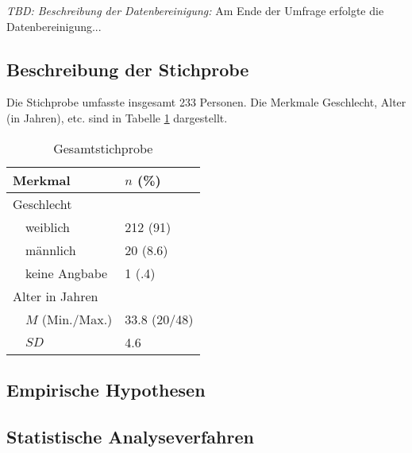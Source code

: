 \textit{TBD: Beschreibung der Datenbereinigung:} Am Ende der Umfrage erfolgte die Datenbereinigung...


\subsection{Beschreibung der Stichprobe}
Die Stichprobe umfasste insgesamt 233 Personen. Die Merkmale Geschlecht, Alter (in Jahren), etc. sind in Tabelle \ref{table:Stichprobe} dargestellt.

\begin{table}[htbp]

\begin{tabular}{m{0.5em}  m{10em}  m{5em}} 
  \hline
  \multicolumn{2}{l}{\textbf{Merkmal}} & \textbf{$n$ (\%)} \\
  \hline
  \multicolumn{2}{l}{Geschlecht} \\ 
   & weiblich & 212 (91)\\ 
   & männlich & 20 (8.6)\\ 
   & keine Angbabe & 1 (.4)\\ 
   
  \multicolumn{2}{l}{Alter in Jahren} \\
  & $M$ (Min./Max.) & 33.8 (20/48) \\
  & $SD$ & 4.6 \\
   
  \hline
\end{tabular}
\caption{Gesamtstichprobe}
\label{table:Stichprobe}
\end{table}


\subsection{Empirische Hypothesen}\label{sec:EmpirischeHypothesen}
\subsection{Statistische Analyseverfahren}